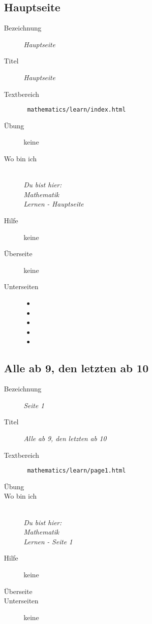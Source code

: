 \subsection{ Hauptseite }
\label{cha:math-learn-page0}
\begin{description}
  \item[Bezeichnung] \emph{ Hauptseite }
  \item[Titel] \emph{ Hauptseite }
  \item[Textbereich] \texttt{ mathematics/learn/index.html }
  \item[Übung] keine
  \item[Wo bin ich] \emph{\\Du bist hier:\\Mathematik\\Lernen - Hauptseite}
  \item[Hilfe] keine
  \item[Überseite] keine
  \item[Unterseiten]
  \begin{itemize}
    \item {}
    \item {}
    \item {}
    \item {}
    \item {}
  \end{itemize}
\end{description}


\subsection{ Alle ab 9, den letzten ab 10 }
\label{cha:math-learn-page1}
\begin{description}
  \item[Bezeichnung] \emph{ Seite 1 }
  \item[Titel] \emph{ Alle ab 9, den letzten ab 10 }
  \item[Textbereich] \texttt{ mathematics/learn/page1.html }
  \item[Übung] 
  \item[Wo bin ich] \emph{\\Du bist hier:\\Mathematik\\Lernen - Seite 1 }
  \item[Hilfe] keine
  \item[Überseite] 
  \item[Unterseiten] keine
\end{description}



